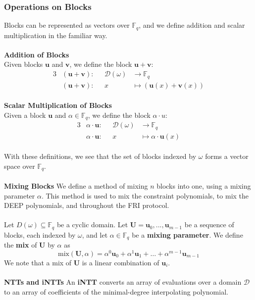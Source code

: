 \documentclass[10pt,letterpaper,titlepage]{article}
\newcommand{\GF}[1]{\mathbb{F}_{#1}}
\newcommand{\w}[0]{\omega}
\newcommand{\D}[0]{\mathcal{D}}
\theoremstyle{definition}
\begin{document}
\begin{appendices}
\subsubsection{Operations on Blocks}
\label{operations}
Blocks can be represented as vectors over $\GF{q}$, and we define addition and scalar multiplication in the familiar way. \\
\\
\textbf{Addition of Blocks}\\
Given blocks $\mathbf{u}$ and $\mathbf{v}$, we define the block $\mathbf{u}+\mathbf{v}$:
\begin{alignat*}{3}
&(\mathbf{u}+\mathbf{v}):\text{ }&\D(\w)&\longrightarrow\GF{q}\\
&(\mathbf{u}+\mathbf{v}):&x&\longmapsto (\mathbf{u}(x)+\mathbf{v}(x))
\end{alignat*}\\
\textbf{Scalar Multiplication of Blocks}\\
Given a block $\mathbf{u}$ and $\alpha\in\GF{q}$, we define the block $\alpha\cdot u$:
\begin{alignat*}{3}
&\alpha\cdot \mathbf{u}: \text{ }&\D(\w)&\longrightarrow\GF{q}\\
&\alpha\cdot \mathbf{u}: &x&\longmapsto\alpha \cdot \mathbf{u}(x)
\end{alignat*}
\\
With these definitions, we see that the set of blocks indexed by $\w$ forms a vector space over $\GF{q}$.\\
\\
\textbf{Mixing Blocks}
\label{mix}
We define a method of mixing $n$ blocks into one, using a mixing parameter $\alpha$.
This method is used to mix the constraint polynomials, to mix the DEEP polynomials, and throughout the FRI protocol. \\
\\
Let $D(\w)\subseteq\mathbb{F}_q$ be a cyclic domain. Let $\mathbf{U}=\mathbf{u}_0,...,\mathbf{u}_{m-1}$ be a sequence of blocks, each indexed by $\w$, and let $\alpha\in\GF{q}$ be a \textbf{mixing parameter}.
We define the \textbf{mix} of $\mathbf{U}$ by $\alpha$ as $$\text{mix}(\mathbf{U},\alpha)=\alpha^0\mathbf{u}_0+\alpha^1\mathbf{u}_1+\ldots+\alpha^{m-1}\mathbf{u}_{m-1}$$
We note that a mix of $\mathbf{U}$ is a linear combination of $\mathbf{u}_i$.\\
\\
\textbf{NTTs and iNTTs}
\label{ntt}
\label{intt}
\noindent
An \textbf{iNTT} converts an array of evaluations over a domain $\D$ to an array of coefficients of the minimal-degree interpolating polynomial.

\end{appendices}
\end{document}
